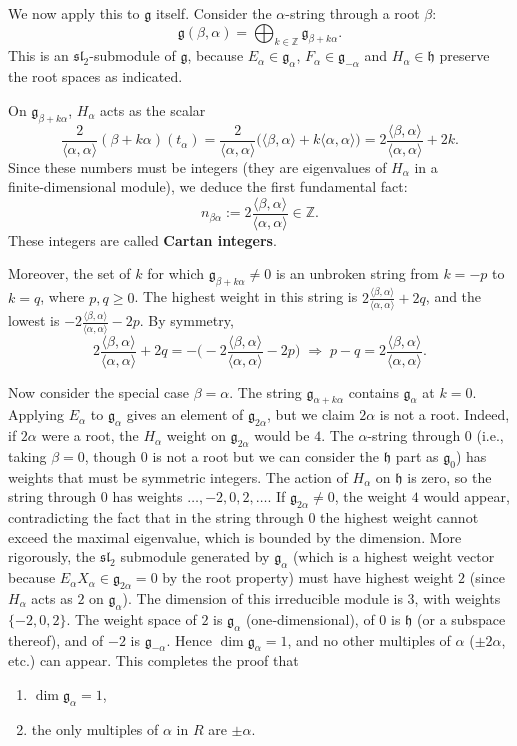 \documentclass{article}
\theoremstyle{definition}
\theoremstyle{remark}
\newcommand{\g}{\mathfrak{g}}
\newcommand{\h}{\mathfrak{h}}
\newcommand{\Z}{\mathbb{Z}}
\begin{document}
We now apply this to $\g$ itself. Consider the $\alpha$-string through a root $\beta$:
\[
\mathfrak{g}(\beta,\alpha) = \bigoplus_{k\in\Z} \g_{\beta+k\alpha}.
\]
This is an $\mathfrak{sl}_2$-submodule of $\g$, because $E_\alpha\in\g_\alpha$,
$F_\alpha\in\g_{-\alpha}$ and $H_\alpha\in\h$ preserve the root spaces as indicated.

On $\g_{\beta+k\alpha}$, $H_\alpha$ acts as the scalar
\[
\frac{2}{\langle\alpha,\alpha\rangle} (\beta+k\alpha)(t_\alpha)
= \frac{2}{\langle\alpha,\alpha\rangle} \big(\langle\beta,\alpha\rangle + k\langle\alpha,\alpha\rangle\big)
= 2\frac{\langle\beta,\alpha\rangle}{\langle\alpha,\alpha\rangle} + 2k.
\]
Since these numbers must be integers (they are eigenvalues of $H_\alpha$ in a
finite‑dimensional module), we deduce the first fundamental fact:
\[
n_{\beta\alpha} := 2\frac{\langle\beta,\alpha\rangle}{\langle\alpha,\alpha\rangle} \in \Z.
\tag{4.2}
\]
These integers are called \textbf{Cartan integers}.

Moreover, the set of $k$ for which $\g_{\beta+k\alpha}\neq0$ is an unbroken string
from $k=-p$ to $k=q$, where $p,q\ge 0$. The highest weight in this string is
$2\frac{\langle\beta,\alpha\rangle}{\langle\alpha,\alpha\rangle} + 2q$, and the lowest
is $-2\frac{\langle\beta,\alpha\rangle}{\langle\alpha,\alpha\rangle} - 2p$. By symmetry,
\[
2\frac{\langle\beta,\alpha\rangle}{\langle\alpha,\alpha\rangle} + 2q
= -\big(-2\frac{\langle\beta,\alpha\rangle}{\langle\alpha,\alpha\rangle} - 2p\big)
\;\Longrightarrow\; p-q = 2\frac{\langle\beta,\alpha\rangle}{\langle\alpha,\alpha\rangle}.
\tag{4.3}
\]

Now consider the special case $\beta=\alpha$. The string $\g_{\alpha+k\alpha}$ contains
$\g_\alpha$ at $k=0$. Applying $E_\alpha$ to $\g_\alpha$ gives an element of
$\g_{2\alpha}$, but we claim $2\alpha$ is not a root. Indeed, if $2\alpha$ were a root,
the $H_\alpha$ weight on $\g_{2\alpha}$ would be $4$. The $\alpha$-string through $0$
(i.e., taking $\beta=0$, though $0$ is not a root but we can consider the $\h$ part
as $\g_0$) has weights that must be symmetric integers. The action of $H_\alpha$ on $\h$
is zero, so the string through $0$ has weights $\dots, -2,0,2,\dots$. If $\g_{2\alpha}\neq0$,
the weight $4$ would appear, contradicting the fact that in the string through $0$ the
highest weight cannot exceed the maximal eigenvalue, which is bounded by the dimension.
More rigorously, the $\mathfrak{sl}_2$ submodule generated by $\g_\alpha$ (which is a
highest weight vector because $E_\alpha X_\alpha \in \g_{2\alpha}=0$ by the root property)
must have highest weight $2$ (since $H_\alpha$ acts as $2$ on $\g_\alpha$). The dimension
of this irreducible module is $3$, with weights $\{-2,0,2\}$. The weight space of $2$
is $\g_\alpha$ (one‑dimensional), of $0$ is $\h$ (or a subspace thereof), and of $-2$
is $\g_{-\alpha}$. Hence $\dim\g_\alpha=1$, and no other multiples of $\alpha$ ($\pm2\alpha$,
etc.) can appear. This completes the proof that
\begin{enumerate}
  \item $\dim\g_\alpha = 1$,
  \item the only multiples of $\alpha$ in $R$ are $\pm\alpha$.
\end{enumerate}
\end{document}
